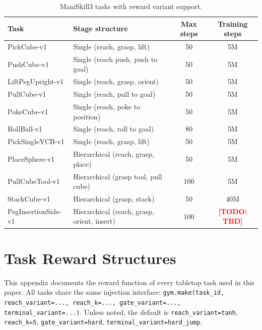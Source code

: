 \documentclass{article}
\newcommand{\todo}[1]{\textcolor{red}{\textbf{[TODO: #1]}}}
\begin{document}
\begin{table}[h]
\centering
\small
\caption{ManiSkill3 tasks with reward variant support.}
\label{tab:tasks}
\begin{tabular}{@{}llcc@{}}
\toprule
\textbf{Task} & \textbf{Stage structure} & \textbf{Max steps} & \textbf{Training steps} \\
\midrule
PickCube-v1        & Single (reach, grasp, lift)      & 50  & 5M  \\
PushCube-v1        & Single (reach push, push to goal) & 50  & 5M  \\
LiftPegUpright-v1  & Single (reach, grasp, orient)    & 50  & 5M  \\
PullCube-v1        & Single (reach, pull to goal)     & 50  & 5M  \\
PokeCube-v1        & Single (reach, poke to position) & 50  & 5M  \\
RollBall-v1        & Single (reach, roll to goal)     & 80  & 5M  \\
PickSingleYCB-v1   & Single (reach, grasp, lift)      & 50  & 5M  \\
\midrule
PlaceSphere-v1     & Hierarchical (reach, grasp, place) & 50 & 5M  \\
PullCubeTool-v1    & Hierarchical (grasp tool, pull cube) & 100 & 5M \\
StackCube-v1       & Hierarchical (grasp, stack)      & 50  & 40M \\
PegInsertionSide-v1 & Hierarchical (reach, grasp, orient, insert) & 100 & \todo{TBD} \\
\bottomrule
\end{tabular}
\end{table}

\section{Task Reward Structures}
\label{app:reward_structures}

This appendix documents the reward function of every tabletop task used in this paper.
All tasks share the same injection interface:
\texttt{gym.make(task\_id, reach\_variant=..., reach\_k=..., gate\_variant=..., terminal\_variant=...)}.
Unless noted, the default is \texttt{reach\_variant=tanh}, \texttt{reach\_k=5},
\texttt{gate\_variant=hard}, \texttt{terminal\_variant=hard\_jump}.
\end{document}
